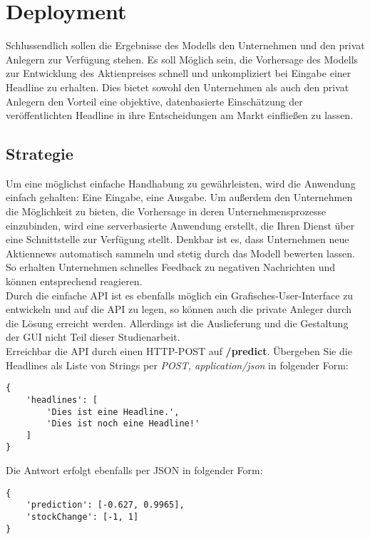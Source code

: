 \chapter{Deployment}
Schlussendlich sollen die Ergebnisse des Modells den Unternehmen und den privat Anlegern zur Verfügung stehen.
Es soll Möglich sein, die Vorhersage des Modells zur Entwicklung des Aktienpreises schnell und unkompliziert bei Eingabe einer Headline zu erhalten.
Dies bietet sowohl den Unternehmen als auch den privat Anlegern den Vorteil eine objektive, datenbasierte Einschätzung der veröffentlichten Headline in ihre Entscheidungen am Markt einfließen zu lassen.

\section{Strategie}
Um eine möglichst einfache Handhabung zu gewährleisten, wird die Anwendung einfach gehalten: Eine Eingabe, eine Ausgabe.
Um außerdem den Unternehmen die Möglichkeit zu bieten, die Vorhersage in deren Unternehmensprozesse einzubinden, wird eine serverbasierte Anwendung erstellt, die Ihren Dienst über eine Schnittstelle zur Verfügung stellt. Denkbar ist es, dass Unternehmen neue Aktiennews automatisch sammeln und stetig durch das Modell bewerten lassen. So erhalten Unternehmen schnelles Feedback zu negativen Nachrichten und können entsprechend reagieren.\\
Durch die einfache API ist es ebenfalls möglich ein Grafisches-User-Interface zu entwickeln und auf die API zu legen, so können auch die private Anleger durch die Lösung erreicht werden.
Allerdings ist die Auslieferung und die Gestaltung der GUI nicht Teil dieser Studienarbeit.\\
Erreichbar die API durch einen HTTP-POST auf \textbf{/predict}.
Übergeben Sie die Headlines als Liste von Strings per \textit{POST, application/json} in folgender Form:
\begin{verbatim}
{
    'headlines': [
        'Dies ist eine Headline.', 
        'Dies ist noch eine Headline!'
    ]
}
\end{verbatim}
Die Antwort erfolgt ebenfalls per JSON in folgender Form:
\begin{verbatim}
{
    'prediction': [-0.627, 0.9965], 
    'stockChange': [-1, 1]
}
\end{verbatim}

